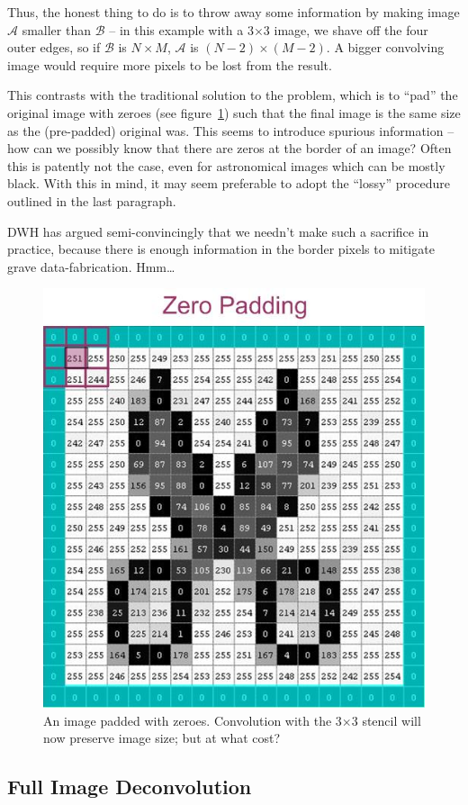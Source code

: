 \documentclass[letterpaper, 11pt]{article}
\begin{document}
Thus, the honest thing to do is to throw away some information by making image $\mathcal A$ smaller than $\mathcal B$ -- in this example with a 3$\times$3 image, we shave off the four outer edges, so if $\mathcal B$ is $N\times M$, $\mathcal A$ is $(N-2)\times(M-2)$. A bigger convolving image would require more pixels to be lost from the result.

This contrasts with the traditional solution to the problem, which is to ``pad'' the original image with zeroes (see figure~\ref{fig:zeropad}) such that the final image is the same size as the (pre-padded) original was. This seems to introduce spurious information -- how can we possibly know that there are zeros at the border of an image? Often this is patently not the case, even for astronomical images which can be mostly black. With this in mind, it may seem preferable to adopt the ``lossy'' procedure outlined in the last paragraph.

DWH has argued semi-convincingly that we needn't make such a sacrifice in practice, because there is enough information in the border pixels to mitigate grave data-fabrication. Hmm\ldots

\begin{figure}[h]\label{fig:zeropad}
	\centering
	\includegraphics[width=0.33\linewidth]{Images/pad_zero_color.jpg}
	\caption{An image padded with zeroes. Convolution with the 3$\times$3 stencil will now preserve image size; but at what cost?}
\end{figure}



\subsection{Full Image Deconvolution}
\label{sec:imdec}
\end{document}

